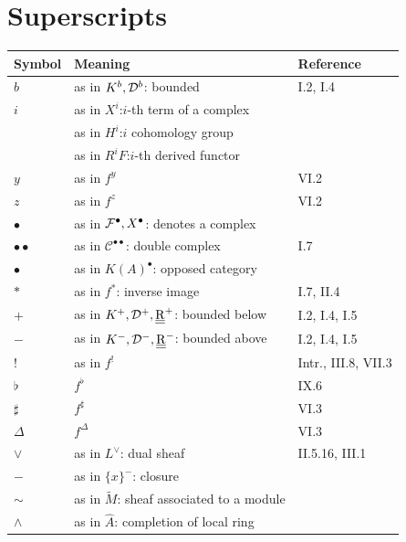 \section*{Superscripts}
\begin{longtable}{@{}l p{8cm} l@{}}
	\toprule
	Symbol & Meaning & Reference \\
	\midrule
	$b$ & as in $K^b, \mathcal{D}^b$: bounded & I.2, I.4 \\
	$i$ & as in $X^i$:$i$-th term of a complex & \\
	& as in $H^i$:$i$ cohomology group & \\
	& as in $R^i F$:$i$-th derived functor & \\
	$y$ & as in $f^y$ & VI.2 \\
	$z$ & as in $f^z$ & VI.2 \\
	$\bullet$ & as in $\mathcal{F}^\bullet, X^\bullet$: denotes a complex  & \\
	$\bullet\bullet$ & as in $\mathcal{C}^{\bullet\bullet}$: double complex & I.7 \\
	$\bullet$ & as in $K(A)^{\bullet}$: opposed category&\\
	$*$& as in $f^*$: inverse image  & I.7, II.4 \\
	$+$ & as in $K^+, \mathcal{D}^+, \underline{\underline{\operatorname{R}}}^+$: bounded below  & I.2, I.4, I.5 \\
	$-$ & as in $K^-, \mathcal{D}^-, \underline{\underline{\operatorname{R}}}^-$: bounded above  & I.2, I.4, I.5 \\
	$!$ & as in $f^!$ & Intr., III.8, VII.3 \\
	$\flat$ & $f^\flat$ & IX.6 \\
	$\sharp$ & $f^\sharp$ & VI.3 \\
	$\Delta$ & $f^\Delta$ & VI.3 \\
	$\vee$ & as in $L^\vee$: dual sheaf & II.5.16, III.1 \\
	$-$ & as in $\{x\}^-$: closure & \\
	$\sim$ & as in $\tilde{M}$: sheaf associated to a module & \\
	$\wedge$ & as in $\hat{A}$: completion of local ring & \\
\end{longtable}

